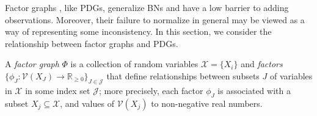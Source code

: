 \documentclass[letterpaper]{article} %
\theoremstyle{plain}
\theoremstyle{definition}
\theoremstyle{remark}
\newcommand{\V}{\mathcal V}
\begin{document}
\label{sec:factor-graphs}
	Factor graphs \cite{KF09}, like PDGs, generalize BNs and have a
        low barrier to adding observations.  Moreover, their failure to
        normalize in general may be viewed as a way of representing
        some
        inconsistency.
        In this section, we consider the relationship between factor graphs
and PDGs.        

\begin{defn}
  A \emph{factor graph} $\Phi$ is a collection of random variables
        $\mathcal X = \{X_i\}$ and \emph{factors}
       $\{\phi_J\colon \V(X_J) \to \mathbb R_{\geq0}\}_{J \in
    \mathcal J }$ %
  that define relationships between subsets $J$ of variables in
        $\mathcal X$ in some index set $\mathcal J$;
more precisely, each factor $\phi_J$ is associated with a subset
$X_j\subseteq \mathcal{X}$,
and values of $\V(X_j)$ to non-negative real numbers.
\end{defn}
\end{document}

